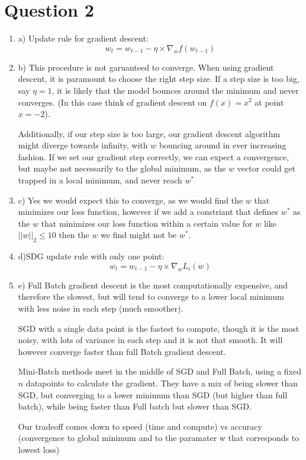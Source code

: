 \documentclass{article}
\theoremstyle{plain}
\theoremstyle{definition}
\begin{document}
\section{Question 2}
\begin{enumerate}
    \item a) Update rule for gradient descent: 
    $$
    w_t = w_{t-1} - \eta \times \nabla_w f(w_{t-1})
    $$
    \item b) This procedure is not garuanteed to converge. When using gradient descent, it is paramount to choose the right step size. If a step size is too big, say $\eta=1$, it is likely that the model bounces around the minimum and never converges. (In this case think of gradient descent on $f(x)=x^2$ at point $x=-2$).
    
    Additionally, if our step size is too large, our gradient descent algorithm might diverge towards infinity, with $w$ bouncing around in ever increasing fashion. If we set our gradient step correctly, we can expect a convergence, but maybe not necessarily to the global minimum, as the $w$ vector could get trapped in a local minimum, and never reach $w^*$
    \item c) Yes we would expect this to converge, as we would find the $w$ that minimizes our loss function, however if we add a constriant that defines $w^*$ as the $w$ that minimizes our loss function within a certain value for $w$ like $||w||_2 \leq 10$ then the $w$ we find might not be $w^*$.
    
    \item d)SDG update rule with only one point:
    $$
        w_t = w_{t-1} - \eta \times \nabla_w L_i(w)
    $$
    \item e) Full Batch gradient descent is the most computationally expensive, and therefore the slowest, but will tend to converge to a lower local minimum with less noise in each step (much smoother).
    
    SGD with a single data point is the fastest to compute, though it is the most noisy, with lots of variance in each step and it is not that smooth. It will however converge faster than full Batch gradient descent.
    
    Mini-Batch methods meet in the middle of SGD and Full Batch, using a fixed $n$ datapoints to calculate the gradient. They have a mix of being slower than SGD, but converging to a lower minimum than SGD (but higher than full batch), while being faster than Full batch but slower than SGD. 
    
    Our tradeoff comes down to speed (time and compute) vs accuracy (convergence to global minimum and to the paramater w that corresponds to lowest loss)
\end{enumerate}
\end{document}
